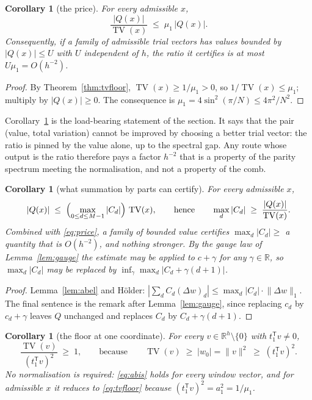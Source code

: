\documentclass[11pt,a4paper]{article}
\theoremstyle{plain}
\newtheorem{corollary}[theorem]{Corollary}
\theoremstyle{definition}
\newcommand{\R}{\mathbb{R}}
\newcommand{\T}{\mathsf{T}}
\newcommand{\TV}{\operatorname{TV}}
\begin{document}
\begin{corollary}[the price]
\label{cor:price}
For every admissible $x$,
\begin{equation}
\label{eq:price}
  \frac{|Q(x)|}{\TV(x)}\;\le\;\mu_1\,|Q(x)| .
\end{equation}
Consequently, if a family of admissible trial vectors has values bounded by
$|Q(x)|\le U$ with $U$ independent of $h$, the ratio it certifies is at most
$U\mu_1=O(h^{-2})$.
\end{corollary}

\begin{proof}
By Theorem~\ref{thm:tvfloor}, $\TV(x)\ge1/\mu_1>0$, so
$1/\TV(x)\le\mu_1$; multiply by $|Q(x)|\ge0$. The consequence is
$\mu_1=4\sin^{2}(\pi/N)\le4\pi^{2}/N^{2}$.
\end{proof}

Corollary~\ref{cor:price} is the load-bearing statement of the section. It says
that the pair (value, total variation) cannot be improved by choosing a better
trial vector: the ratio is pinned by the value alone, up to the spectral gap.
Any route whose output is the ratio therefore pays a factor $h^{-2}$ that is a
property of the parity spectrum meeting the normalisation, and not a property of
the comb.

\begin{corollary}[what summation by parts can certify]
\label{cor:holder}
For every admissible $x$,
\begin{equation}
\label{eq:holder}
  |Q(x)|\;\le\;\Bigl(\max_{0\le d\le M-1}|C_d|\Bigr)\,\TV(x),
  \qquad\text{hence}\qquad
  \max_{d}|C_d|\;\ge\;\frac{|Q(x)|}{\TV(x)} .
\end{equation}
Combined with \eqref{eq:price}, a family of bounded value certifies
$\max_d|C_d|\ge$ a quantity that is $O(h^{-2})$, and nothing stronger. By the
gauge law of Lemma~\ref{lem:gauge} the estimate may be applied to $c+\gamma$ for
any $\gamma\in\R$, so $\max_d|C_d|$ may be replaced by
$\inf_{\gamma}\max_d|C_d+\gamma(d+1)|$.
\end{corollary}

\begin{proof}
Lemma~\ref{lem:abel} and H\"older: $|\sum_dC_d(\Delta w)_d|
\le\max_d|C_d|\cdot\lVert\Delta w\rVert_1$. The final sentence is the remark
after Lemma~\ref{lem:gauge}, since replacing $c_d$ by $c_d+\gamma$ leaves
$Q$ unchanged and replaces $C_d$ by $C_d+\gamma(d+1)$.
\end{proof}

\begin{corollary}[the floor at one coordinate]
\label{cor:abis}
For every $v\in\R^{h}\setminus\{0\}$ with $t_1^{\T}v\ne0$,
\begin{equation}
\label{eq:abis}
  \frac{\TV(v)}{(t_1^{\T}v)^{2}}\;\ge\;1,
  \qquad\text{because}\qquad
  \TV(v)\;\ge\;|w_0|=\lVert v\rVert^{2}\;\ge\;(t_1^{\T}v)^{2} .
\end{equation}
No normalisation is required: \eqref{eq:abis} holds for every window vector, and
for admissible $x$ it reduces to \eqref{eq:tvfloor} because
$(t_1^{\T}v)^{2}=a_1^{2}=1/\mu_1$.
\end{corollary}
\end{document}
